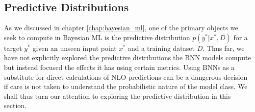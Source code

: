 \subsection{Predictive Distributions}
As we discussed in chapter \ref{chap:bayesian_ml}, one of the primary objects we seek to compute
in Bayesian ML is the predictive distribution $p(y^*|x^*, D)$ for a target $y^*$ given an unseen input point $x^*$ and
a training dataset $D$. Thus far, we have not explicitly explored the predictive distributions the BNN models compute but instead focused the effects it has using certain metrics. Using BNNs as a substitute for direct calculations of NLO predictions can be a dangerous decision if care is not taken to understand the probabilistic nature of the model class. We shall thus turn our attention to exploring the predictive distribution in this section.

